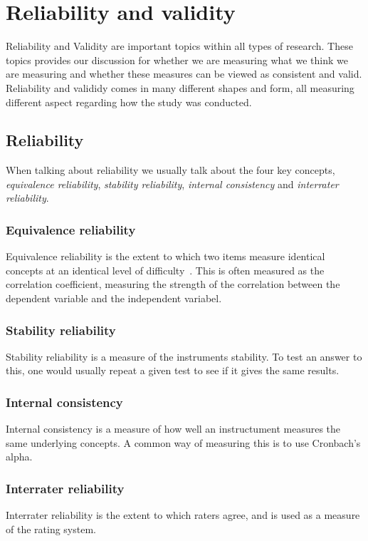 \chapter{Reliability and validity}
Reliability and Validity are important topics within all types of research. 
These topics provides our discussion for whether we are measuring what we think we are measuring and whether these measures can be viewed as  consistent and valid. 
Reliability and valididy comes in many different shapes and form, all measuring different aspect regarding how the study was conducted.

\section{Reliability}
	When talking about reliability we usually talk about the four key concepts, \textit{equivalence reliability}, \textit{stability reliability}, \textit{internal consistency} and  \textit{interrater reliability}. 
	
	\subsection{Equivalence reliability}
	Equivalence reliability is the extent to which two items measure identical concepts at an identical level of difficulty~\cite{colostateReliability}. This is often measured as the correlation coefficient, measuring the strength of the correlation between the dependent variable and the independent variabel. 
	
	\subsection{Stability reliability}
	Stability reliability is a measure of the instruments stability. To test an answer to this, one would usually repeat a given test to see if it gives the same results.
	
	\subsection{Internal consistency}
	Internal consistency is a measure of how well an instructument measures the same underlying concepts. A common way of measuring this is to use Cronbach's alpha.
	
	\subsection{Interrater reliability}
	Interrater reliability is the extent to which raters agree, and is used as a measure of the rating system. 
	
